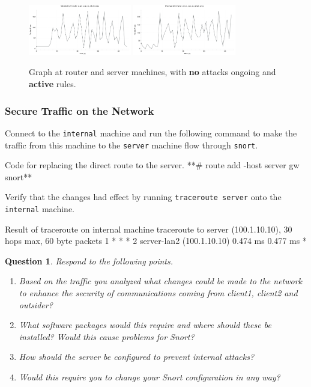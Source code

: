 \documentclass[a4paper,11pt,hidelinks]{article}
\newtheorem{theorem}{Question}[subsection]
\begin{document}
\begin{figure}[ht!]
    \centering
    \includegraphics[width=0.4\textwidth]{../drawable/router_rule_no_attack.pdf}
    \includegraphics[width=0.4\textwidth]{../drawable/server_rule_no_attack.pdf}
    \caption{Graph at router and server machines, with \textbf{no} attacks ongoing and \textbf{active} rules.}
\end{figure}

\clearpage

\subsubsection{Secure Traffic on the Network}
Connect to the \texttt{internal} machine and run the following command to make the traffic from this machine to the \texttt{server} machine flow through \texttt{snort}.
\begin{code}{Code for replacing the direct route to the server.}
**# route add -host server gw snort**
\end{code}

Verify that the changes had effect by running \texttt{traceroute server} onto the \texttt{internal} machine.

\begin{code}{Result of traceroute on internal machine}
traceroute to server (100.1.10.10), 30 hops max, 60 byte packets
 1  * * *
 2  server-lan2 (100.1.10.10)  0.474 ms  0.477 ms *
\end{code}

\begin{theorem}
    Respond to the following points.
    \begin{enumerate}
        \item Based on the traffic you analyzed what changes could be made to the network to enhance the security of communications coming from client1, client2 and outsider?
        \item What software packages would this require and where should these be installed? Would this cause problems for Snort?
        \item How should the server be configured to prevent internal attacks?
        \item Would this require you to change your Snort configuration in any way?
    \end{enumerate}
\end{theorem}
\end{document}
